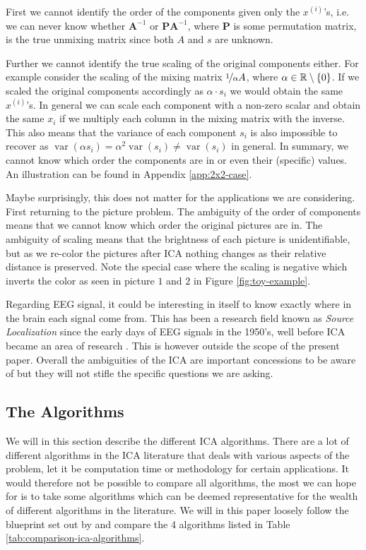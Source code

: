 	First we cannot identify the order of the components given only the $x^{(i)}$'s, i.e. we can never know whether $\textbf{A}^{-1}$ or $\textbf{P}\textbf{A}^{-1}$, where $\textbf{P}$ is some permutation matrix, is the true unmixing matrix since both $A$ and $s$ are unknown. 

	Further we cannot identify the true scaling of the original components either. For example consider the scaling of the mixing matrix $\nicefrac{1}{\alpha} A$, where $\alpha \in \mathbb{R}\setminus \{0\}$. If we scaled the original components accordingly as $\alpha\cdot s_i$ we would obtain the same $x^{(i)}$'s. In general we can scale each component with a non-zero scalar and obtain the same $x_i$ if we multiply each column in the mixing matrix with the inverse. This also means that the variance of each component $s_i$ is also impossible to recover as $\operatorname{var}(\alpha s_i)=\alpha^2 \operatorname{var}(s_i)\neq \operatorname{var}(s_i)$ in general. In summary, we cannot know which order the components are in or even their (specific) values. An illustration can be found in Appendix \ref{app:2x2-case}.

	Maybe surprisingly, this does not matter for the applications we are considering. First returning to the picture problem. The ambiguity of the order of components means that we cannot know which order the original pictures are in. The ambiguity of scaling means that the brightness of each picture is unidentifiable, but as we re-color the pictures after ICA nothing changes as their relative distance is preserved. Note the special case where the scaling is negative which inverts the color as seen in picture $1$ and $2$ in Figure \ref{fig:toy-example}.

	Regarding EEG signal, it could be interesting in itself to know exactly where in the brain each signal come from. This has been a research field known as \textit{Source Localization} since the early days of EEG signals in the 1950's, well before ICA became an area of research \cite{christoph2019}. This is however outside the scope of the present paper. Overall the ambiguities of the ICA are important concessions to be aware of but they will not stifle the specific questions we are asking. 

	\subsection{The Algorithms}\label{sec:ica-algorithms}

	We will in this section describe the different ICA algorithms. There are a lot of different algorithms in the ICA literature that deals with various aspects of the problem, let it be computation time or methodology for certain applications. It would therefore not be possible to compare all algorithms, the most we can hope for is to take some algorithms which can be deemed representative for the wealth of different algorithms in the literature. We will in this paper loosely follow the blueprint set out by \cite{pfister2019} and compare the 4 algorithms listed in Table \ref{tab:comparison-ica-algorithms}.

